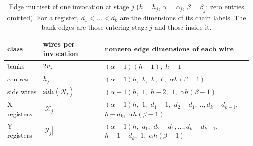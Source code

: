 \begin{table}[ht]\centering\small
\begin{tabular}{@{}l l l@{}}
\toprule
class & wires per invocation & nonzero edge dimensions of each wire\\
\midrule
banks & $2v_j$ & $(\alpha-1)(h-1)$,\ $h-1$\\
centres & $h_j$ & $(\alpha-1)h$,\ $h$,\ $h$,\ $h$,\ $\alpha h(\beta-1)$\\
side wires & $\mathrm{side}(\mathcal R_j)$ & $(\alpha-1)h$,\ $1$,\ $h-2$,\ $1$,\ $\alpha h(\beta-1)$\\
X-registers & $|\mathcal X_j|$ & $(\alpha-1)h$,\ $1$,\ $d_1-1$,\ $d_2-d_1,\dots,d_k-d_{k-1}$,\ $h-d_k$,\ $\alpha h(\beta-1)$\\
Y-registers & $|\mathcal Y_j|$ & $(\alpha-1)h$,\ $d_1$,\ $d_2-d_1,\dots,d_k-d_{k-1}$,\ $h-1-d_k$,\ $1$,\ $\alpha h(\beta-1)$\\
\bottomrule
\end{tabular}
\caption{Edge multiset of one invocation at stage $j$ ($h=h_j$, $\alpha=\alpha_j$, $\beta=\beta_j$; zero
entries omitted). For a register, $d_1<\dots<d_k$ are the dimensions of its chain labels. The bank edges
are those entering stage $j$ and those inside it.}\label{col:tab:multiset}
\end{table}

